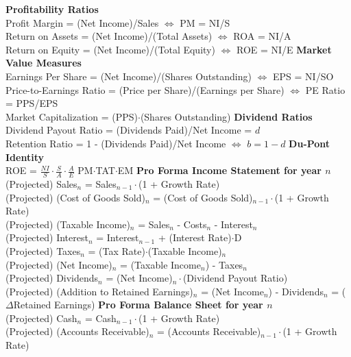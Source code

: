 \documentclass{letter}
\begin{document}
\textbf{Profitability Ratios} \\
Profit Margin = (Net Income)/Sales $\iff$ PM = NI/S \\
Return on Assets = (Net Income)/(Total Assets) $\iff$ ROA = NI/A \\
Return on Equity = (Net Income)/(Total Equity) $\iff$ ROE = NI/E
\newline
\textbf{Market Value Measures} \\
Earnings Per Share = (Net Income)/(Shares Outstanding) $\iff$ EPS = NI/SO \\
Price-to-Earnings Ratio = (Price per Share)/(Earnings per Share) $\iff$ PE Ratio = PPS/EPS \\
Market Capitalization = (PPS)$\cdot$(Shares Outstanding)
\newline
\textbf{Dividend Ratios} \\
Dividend Payout Ratio = (Dividends Paid)/Net Income = $d$ \\
Retention Ratio = 1 - (Dividends Paid)/Net Income $\iff$ $b = 1 - d$
\newline
\textbf{Du-Pont Identity} \\
ROE = $\frac{NI}{S} \cdot \frac{S}{A} \cdot \frac{A}{E}$ PM$\cdot$TAT$\cdot$EM
\newline
\textbf{Pro Forma Income Statement for year $n$} \\
(Projected) Sales$_n$ = Sales$_{n - 1} \cdot$(1 + Growth Rate) \\
(Projected) (Cost of Goods Sold)$_n$ = (Cost of Goods Sold)$_{n - 1} \cdot$(1 + Growth Rate) \\
(Projected) (Taxable Income)$_n$ = Sales$_n$ - Costs$_n$ - Interest$_n$ \\
(Projected) Interest$_n$ = Interest$_{n - 1}$ + (Interest Rate)$\cdot$D \\
(Projected) Taxes$_n$ = (Tax Rate)$\cdot$(Taxable Income)$_n$ \\
(Projected) (Net Income)$_n$ = (Taxable Income$_n$) - Taxes$_n$ \\
(Projected) Dividends$_n$ = (Net Income)$_n \cdot$(Dividend Payout Ratio) \\
(Projected) (Addition to Retained Earnings)$_n$ = (Net Income$_n$) - Dividends$_n$ = ($\Delta$Retained Earnings)
\newline
\textbf{Pro Forma Balance Sheet for year $n$} \\
(Projected) Cash$_n$ = Cash$_{n - 1} \cdot$(1 + Growth Rate) \\
(Projected) (Accounts Receivable)$_n$ = (Accounts Receivable)$_{n - 1} \cdot$(1 + Growth Rate) \\
\end{document}
